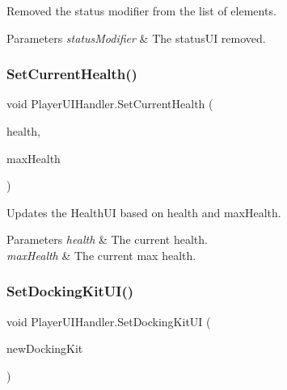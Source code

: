 Removed the status modifier from the list of elements. 


\begin{DoxyParams}{Parameters}
{\em status\+Modifier} & The status\+UI removed.\\
\hline
\end{DoxyParams}
\hypertarget{class_player_u_i_handler_ae527bfe70834ce8fe459d956f25e1607}{}\label{class_player_u_i_handler_ae527bfe70834ce8fe459d956f25e1607} 
\subsubsection{\texorpdfstring{Set\+Current\+Health()}{SetCurrentHealth()}}
{\footnotesize\ttfamily void Player\+U\+I\+Handler.\+Set\+Current\+Health (\begin{DoxyParamCaption}\item[{float}]{health,  }\item[{float}]{max\+Health }\end{DoxyParamCaption})}



Updates the Health\+UI based on health and max\+Health. 


\begin{DoxyParams}{Parameters}
{\em health} & The current health.\\
\hline
{\em max\+Health} & The current max health.\\
\hline
\end{DoxyParams}
\hypertarget{class_player_u_i_handler_abac7fc9da80f3f52602e789bf7d7d786}{}\label{class_player_u_i_handler_abac7fc9da80f3f52602e789bf7d7d786} 
\subsubsection{\texorpdfstring{Set\+Docking\+Kit\+U\+I()}{SetDockingKitUI()}}
{\footnotesize\ttfamily void Player\+U\+I\+Handler.\+Set\+Docking\+Kit\+UI (\begin{DoxyParamCaption}\item[{\hyperlink{class_docking_kit}{Docking\+Kit}}]{new\+Docking\+Kit }\end{DoxyParamCaption})}



